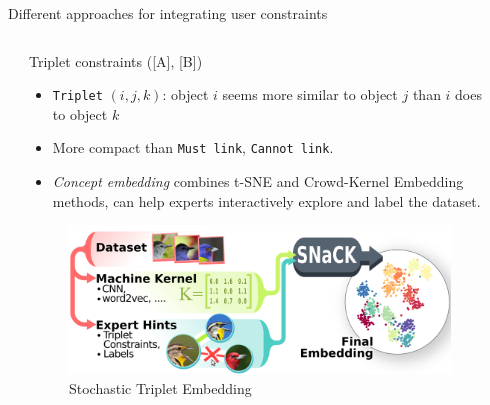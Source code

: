 \documentclass{beamer}
\begin{document}
\begin{frame}[fragile]
\begin{block}{Different approaches for integrating user constraints}
\begin{columns}[T]
\begin{column}{.3\textwidth}
  \end{column}

  \begin{column}{.3\textwidth}

      \begin{block}{Triplet constraints ([A], [B])}
        \begin{itemize}
          \item \texttt{Triplet} $(i, j, k)$: object $i$ seems more similar to object $j$ than $i$ does to object $k$
          \item More compact than \texttt{Must link}, \texttt{Cannot link}.
          \item \emph{Concept embedding} combines t-SNE and Crowd-Kernel Embedding methods,
            can help experts interactively explore and label the dataset.
        \end{itemize}
        \begin{figure}[h!]
          \includegraphics[width=\linewidth]{eg_triplet}
          \caption{Stochastic Triplet Embedding \cite{van2012ste}}
        \end{figure}
      \end{block}

  \end{column}

\begin{column}{.34\textwidth}



\end{column}
\end{columns}
\end{block}
\end{frame}
\end{document}
